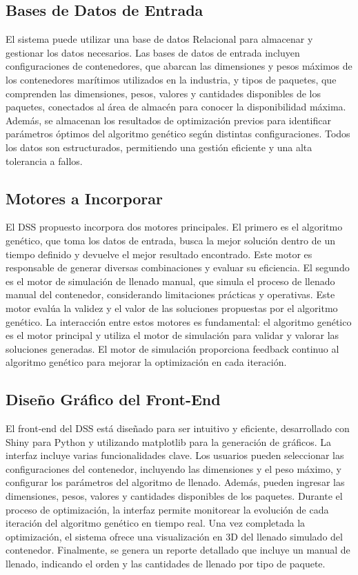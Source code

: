 \documentclass[9pt,a4paper]{rho}
\begin{document}
\subsection{Bases de Datos de Entrada}

El sistema puede utilizar una base de datos \cite{elmasri2021fundamentals} Relacional para almacenar y gestionar los datos necesarios. Las bases de datos de entrada incluyen configuraciones de contenedores, que abarcan las dimensiones y pesos máximos de los contenedores marítimos utilizados en la industria, y tipos de paquetes, que comprenden las dimensiones, pesos, valores y cantidades disponibles de los paquetes, conectados al área de almacén para conocer la disponibilidad máxima. Además, se almacenan los resultados de optimización previos para identificar parámetros óptimos del algoritmo genético según distintas configuraciones. Todos los datos son estructurados, permitiendo una gestión eficiente y una alta tolerancia a fallos.

\subsection{Motores a Incorporar}

El DSS propuesto incorpora dos motores principales. El primero es el algoritmo genético, que toma los datos de entrada, busca la mejor solución dentro de un tiempo definido y devuelve el mejor resultado encontrado. Este motor es responsable de generar diversas combinaciones y evaluar su eficiencia. El segundo es el motor de simulación de llenado manual, que simula el proceso de llenado manual del contenedor, considerando limitaciones prácticas y operativas. Este motor evalúa la validez y el valor de las soluciones propuestas por el algoritmo genético. La interacción entre estos motores es fundamental: el algoritmo genético es el motor principal y utiliza el motor de simulación para validar y valorar las soluciones generadas. El motor de simulación proporciona feedback continuo al algoritmo genético para mejorar la optimización en cada iteración.

\subsection{Diseño Gráfico del Front-End}

El front-end del DSS está diseñado para ser intuitivo y eficiente, desarrollado con Shiny para Python y utilizando matplotlib para la generación de gráficos. La interfaz incluye varias funcionalidades clave. Los usuarios pueden seleccionar las configuraciones del contenedor, incluyendo las dimensiones y el peso máximo, y configurar los parámetros del algoritmo de llenado. Además, pueden ingresar las dimensiones, pesos, valores y cantidades disponibles de los paquetes. Durante el proceso de optimización, la interfaz permite monitorear la evolución de cada iteración del algoritmo genético en tiempo real. Una vez completada la optimización, el sistema ofrece una visualización en 3D del llenado simulado del contenedor. Finalmente, se genera un reporte detallado que incluye un manual de llenado, indicando el orden y las cantidades de llenado por tipo de paquete.
\end{document}
